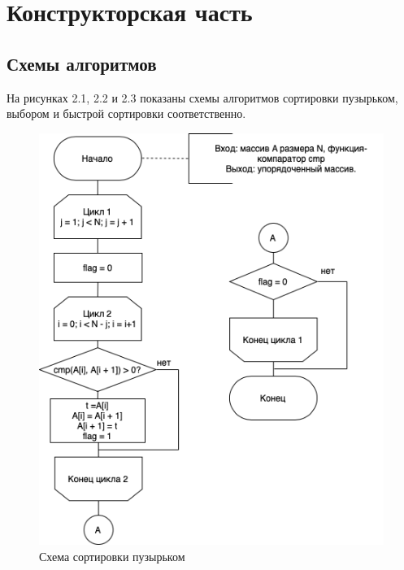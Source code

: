 \documentclass{report}
\begin{document}
\clearpage

\chapter{Конструкторская часть}

\section{Схемы алгоритмов}

На рисунках 2.1, 2.2 и 2.3 показаны схемы алгоритмов сортировки пузырьком, выбором и быстрой сортировки соответственно.

\begin{figure}[h!p]
	\centering
	\includegraphics[scale = 0.75]{bsort.png}
	\caption{Схема сортировки пузырьком}
	\label{fig:mpr}
\end{figure}
\end{document}
